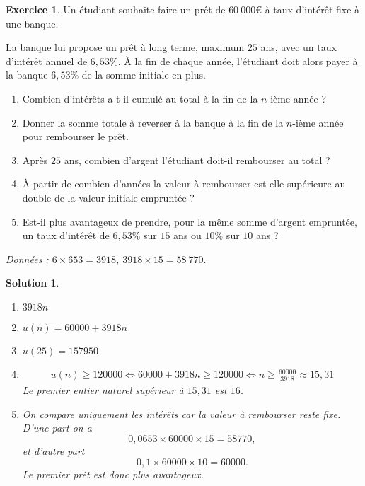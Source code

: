 \documentclass[12pt]{paper}
\theoremstyle{plain}
\newtheorem*{sol}{Solution}
\theoremstyle{definition}
\newtheorem{ex}{Exercice}
\newif\ifsolutions
\newcommand{\exe}[2]{
		\begin{ex} #1  \end{ex}
		\begin{sol} #2 \end{sol}
	}
\newcommand{\exe}[2]{
		\begin{ex} #1  \end{ex}
	}
\begin{document}
\pagestyle{fancy}
\fancyhead[C]{\textbf{Suites arithmétiques 1 \ifsolutions -- Solutions \fi}}
\fancyhead[R]{\today}


\exe{
	Un étudiant souhaite faire un prêt de $60 \ 000$€ 	 à taux d'intérêt fixe à une banque.
	
	La banque lui propose un prêt à long terme, maximum $25$ ans, avec un taux d'intérêt annuel de $6{,}53 \%$.
	À la fin de chaque année, l'étudiant doit alors payer à la banque $6{,}53 \%$ de la somme initiale en plus.
	
	\begin{enumerate}
		\item Combien d'intérêts a-t-il cumulé au total à la fin de la $n$-ième année ?
		
		\item Donner la somme totale à reverser à la banque à la fin de la $n$-ième année pour rembourser le prêt.
		
		\item Après $25$ ans, combien d'argent l'étudiant doit-il rembourser au total ?
		
		\item À partir de combien d'années la valeur à rembourser est-elle supérieure au double de la valeur initiale empruntée ?
		
		\item Est-il plus avantageux de prendre, pour la même somme d'argent empruntée, un taux d'intérêt de $6{,}53\%$ sur $15$ ans ou $10\%$ sur $10$ ans ?
		
	\end{enumerate}
	
	\emph{Données : $6 \times 653 = 3918$, \qquad $3918 \times 15 = 58 \ 770.$}
}{
	\begin{enumerate}
		\item $3918n$
		\item $u(n) = 60 000 + 3918n$
		\item $u(25) = 157 950$
		\item 
			\begin{align*}
			u(n) \geq 120 000 \iff 60 000 + 3918n \geq 120 000 \iff n \geq \frac{60 000}{3918} \approx 15{,}31
			\end{align*}
			Le premier entier naturel supérieur à $15{,}31$ est $16$.
		\item On compare uniquement les intérêts car la valeur à rembourser reste fixe.
		D'une part on a 
			\[ 0,0653 \times 60 000 \times 15  = 58 770, \]
		et d'autre part
			\[ 0,1 \times 60 000 \times 10 = 60 000. \]
		Le premier prêt est donc plus avantageux.
	\end{enumerate}


}
\end{document}
